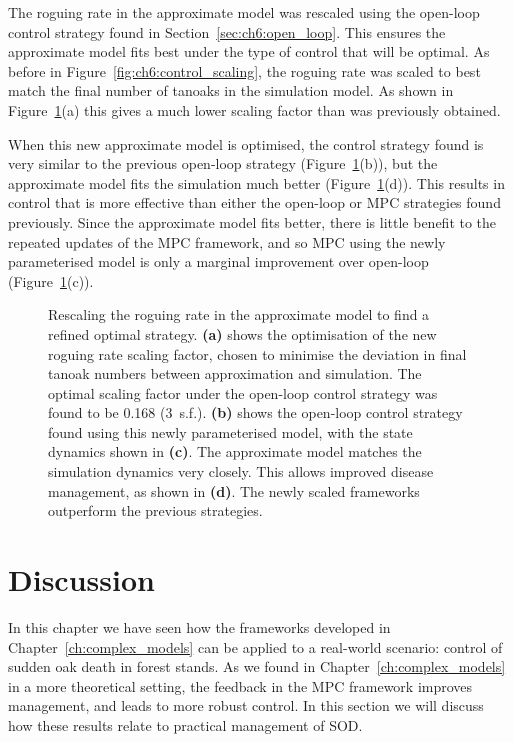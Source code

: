The roguing rate in the approximate model was rescaled using the open-loop control strategy found in Section~\ref{sec:ch6:open_loop}. This ensures the approximate model fits best under the type of control that will be optimal. As before in Figure~\ref{fig:ch6:control_scaling}, the roguing rate was scaled to best match the final number of tanoaks in the simulation model. As shown in Figure~\ref{fig:ch6:Global_optimal}(a) this gives a much lower scaling factor than was previously obtained.

When this new approximate model is optimised, the control strategy found is very similar to the previous open-loop strategy (Figure~\ref{fig:ch6:Global_optimal}(b)), but the approximate model fits the simulation much better (Figure~\ref{fig:ch6:Global_optimal}(d)). This results in control that is more effective than either the open-loop or MPC strategies found previously. Since the approximate model fits better, there is little benefit to the repeated updates of the MPC framework, and so MPC using the newly parameterised model is only a marginal improvement over open-loop (Figure~\ref{fig:ch6:Global_optimal}(c)).

\begin{figure}[H]
    \begin{center}
        \caption[Refined optimal strategy under rescaled roguing rate]{Rescaling the roguing rate in the approximate model to find a refined optimal strategy. \textbf{(a)} shows the optimisation of the new roguing rate scaling factor, chosen to minimise the deviation in final tanoak numbers between approximation and simulation. The optimal scaling factor under the open-loop control strategy was found to be 0.168 (3~s.f.). \textbf{(b)} shows the open-loop control strategy found using this newly parameterised model, with the state dynamics shown in \textbf{(c)}. The approximate model matches the simulation dynamics very closely. This allows improved disease management, as shown in \textbf{(d)}. The newly scaled frameworks outperform the previous strategies.\label{fig:ch6:Global_optimal}}
    \end{center}
\end{figure}

\section{Discussion\label{sec:ch6:discussion}}

In this chapter we have seen how the frameworks developed in Chapter~\ref{ch:complex_models} can be applied to a real-world scenario: control of sudden oak death in forest stands. As we found in Chapter~\ref{ch:complex_models} in a more theoretical setting, the feedback in the MPC framework improves management, and leads to more robust control. In this section we will discuss how these results relate to practical management of SOD.

